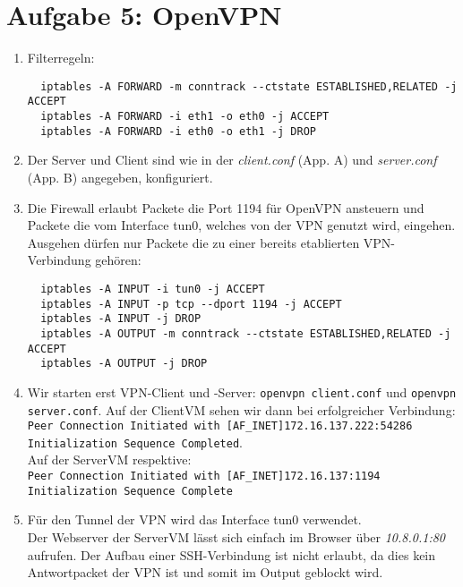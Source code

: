 \documentclass{scrartcl}
\begin{document}
		      \section*{Aufgabe 5: OpenVPN}
		      \label{sec:OpenVPN}
		      \begin{enumerate}
		      	\item Filterregeln:
		      	      \begin{lstlisting}
  iptables -A FORWARD -m conntrack --ctstate ESTABLISHED,RELATED -j ACCEPT
  iptables -A FORWARD -i eth1 -o eth0 -j ACCEPT
  iptables -A FORWARD -i eth0 -o eth1 -j DROP
		      	\end{lstlisting}

		      	\item
		      	      Der Server und Client sind wie in der \textit{client.conf} (App. A)
		      	      und \textit{server.conf} (App. B) angegeben, konfiguriert.
		      	\item Die Firewall erlaubt Packete die Port 1194 für OpenVPN
		      	      ansteuern und Packete die vom Interface tun0, welches von der VPN
		      	      genutzt wird, eingehen.
		      	      Ausgehen dürfen nur Packete die zu einer bereits etablierten
		      	      VPN-Verbindung gehören:
		      	      \begin{lstlisting}
  iptables -A INPUT -i tun0 -j ACCEPT
  iptables -A INPUT -p tcp --dport 1194 -j ACCEPT
  iptables -A INPUT -j DROP
  iptables -A OUTPUT -m conntrack --ctstate ESTABLISHED,RELATED -j ACCEPT
  iptables -A OUTPUT -j DROP
		      	\end{lstlisting}
		      	\item
		      	      Wir starten erst VPN-Client und -Server:
		      	      \texttt{openvpn client.conf} und \texttt{openvpn server.conf}.
		      	      Auf der ClientVM sehen wir dann bei erfolgreicher Verbindung:\\
		      	      \texttt{Peer Connection Initiated with [AF\_INET]172.16.137.222:54286 \\
                  Initialization Sequence Completed}.\\
		      	      Auf der ServerVM respektive:\\
		      	      \texttt{Peer Connection Initiated with [AF\_INET]172.16.137:1194 \\
                  Initialization Sequence Complete}\\
            \item
                  Für den Tunnel der VPN wird das Interface tun0 verwendet.\\
                  Der Webserver der ServerVM lässt sich einfach im Browser über
                  \textit{10.8.0.1:80} aufrufen.
                  Der Aufbau einer SSH-Verbindung ist nicht erlaubt, da dies
                  kein Antwortpacket der VPN ist und somit im Output geblockt
                  wird.
		      \end{enumerate}
\end{document}
